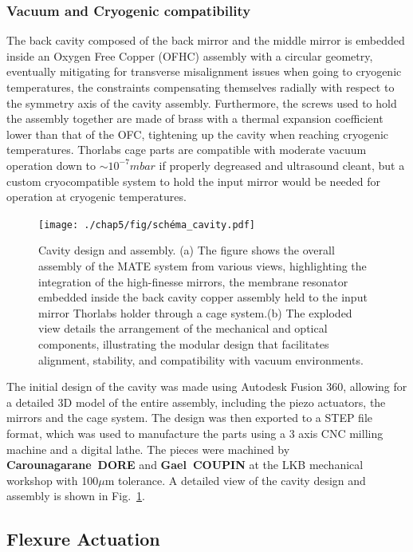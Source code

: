 \subsubsection{Vacuum and Cryogenic compatibility}
The back cavity composed of the back mirror and the middle mirror is embedded inside an Oxygen Free Copper (OFHC) assembly with a circular geometry, eventually mitigating for transverse misalignment issues when going to cryogenic temperatures, the constraints compensating themselves radially with respect to the symmetry axis of the cavity assembly\cite{OFHC_review}. Furthermore, the screws used to hold the assembly together are made of brass with a thermal expansion coefficient lower than that of the OFC, tightening up the cavity when reaching cryogenic temperatures.
Thorlabs cage parts are compatible with moderate vacuum operation down to $\sim 10^{-7} mbar$ if properly degreased and ultrasound cleant, but a custom cryocompatible system to hold the input mirror would be needed for operation at cryogenic temperatures. \\


\begin{figure}
    \centering  
    \texttt{[image: ./chap5/fig/schéma\_cavity.pdf]}
    \caption{Cavity design and assembly. (a) The figure shows the overall assembly of the MATE system from various views, highlighting the integration of the high-finesse mirrors, the membrane resonator embedded inside the back cavity copper assembly held to the input mirror Thorlabs holder through a cage system.(b) The exploded view details the arrangement of the mechanical and optical components, illustrating the modular design that facilitates alignment, stability, and compatibility with vacuum environments.}
    \label{fig:cad_cavity}
\end{figure}


The initial design of the cavity was made using Autodesk Fusion 360, allowing for a detailed 3D model of the entire assembly, including the piezo actuators, the mirrors and the cage system. The design was then exported to a STEP file format, which was used to manufacture the parts using a 3 axis CNC milling machine and a digital lathe. The pieces were machined by \textbf{Carounagarane~DORE} and \textbf{Gael~COUPIN} at the LKB mechanical workshop with 100$\mu$m tolerance. A detailed view of the cavity design and assembly is shown in Fig.~\ref{fig:cad_cavity}.

\subsection{Flexure Actuation}


